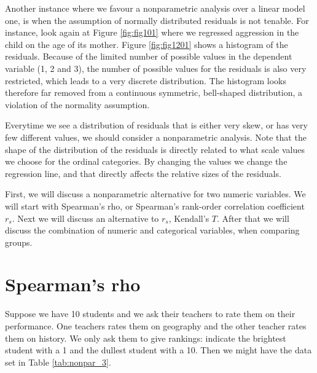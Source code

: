 Another instance where we favour a nonparametric analysis over a linear model one, is when the assumption of normally distributed residuals is not tenable. For instance, look again at Figure \ref{fig:fig101} where we regressed aggression in the child on the age of its mother. Figure \ref{fig:fig1201} shows a histogram of the residuals. Because of the limited number of possible values in the dependent variable (1, 2 and 3), the number of possible values for the residuals is also very restricted, which leads to a very discrete distribution. The histogram looks therefore far removed from a continuous symmetric, bell-shaped distribution, a violation of the normality assumption. 

\begin{knitrout}
\color{fgcolor}\begin{kframe}


{\ttfamily\noindent\bfseries{}}\end{kframe}
\end{knitrout}

Everytime we see a distribution of residuals that is either very skew, or has very few different values, we should consider a nonparametric analysis. Note that the shape of the distribution of the residuals is directly related to what scale values we choose for the ordinal categories. By changing the values we change the regression line, and that directly affects the relative sizes of the residuals. 

First, we will discuss a nonparametric alternative for two numeric variables. We will start with Spearman's rho, or Spearman's rank-order correlation coefficient $r_s$. Next we will discuss an alternative to $r_s$, Kendall's $T$. After that we will discuss the combination of numeric and categorical variables, when comparing groups.

\section{Spearman's rho}

Suppose we have 10 students and we ask their teachers to rate them on their performance. One teachers rates them on geography and the other teacher rates them on history. We only ask them to give rankings: indicate the brightest student with a 1 and the dullest student with a 10. Then we might have the data set in Table \ref{tab:nonpar_3}.

